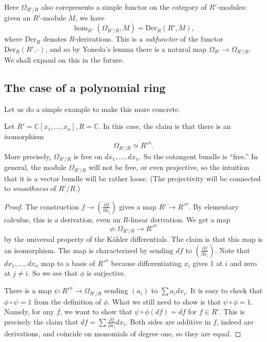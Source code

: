 Here $\Omega_{R'/R}$ also corepresents a simple functor on the category of
$R'$-modules: given an $R'$-module $M$, we have
\[ \hom_{R'}(\Omega_{R'/R}, M) = \mathrm{Der}_R(R', M),  \]
where $\mathrm{Der}_R$ denotes $R$-derivations.
This is a \emph{subfunctor} of the functor $\mathrm{Der}_R(R', \cdot)$, and so
by Yoneda's lemma there is a natural map $\Omega_{R'} \to \Omega_{R'/R}$.
We shall expand on this in the future.

\subsection{The case of a polynomial ring}
Let us do a simple example to make this more concrete.

\begin{example} \label{polynomialringdiff}
Let $R' = \mathbb{C}[x_1, \dots, x_n], R = \mathbb{C}$. In this case, the claim
is that there is an isomorphism
\[ \Omega_{R'/R} \simeq R'^n.  \]
More precisely, $\Omega_{R'/R}$ is free on $dx_1, \dots,dx_n$. So the cotangent
bundle is ``free.'' In general, the module $\Omega_{R'/R}$ will not be free, or
even projective, so the intuition that it is a vector bundle will be rather
loose. (The projectivity will be connected to \emph{smoothness} of $R'/R$.)

\begin{proof} 
The construction $f \to \left( \frac{\partial f}{\partial x_i}  \right)$ gives
a map $R' \to R'^n$. By elementary calculus, this is a derivation, even an
$R$-linear derivation.  We get a map
\[ \phi:\Omega_{R'/R} \to R'^n  \]
by the universal property of the K\"ahler differentials. The claim is that this
map is an isomorphism. The map is characterized by sending $df$ to $\left(
\frac{\partial f}{\partial x_i}\right)$. Note that $dx_1, \dots, dx_n$ map to a
basis of $R'^n$ because differentiating $x_i$ gives 1 at $i$ and zero at $j
\neq i$. So we see that $\phi$ is surjective. 

There is a map $\psi: R'^n \to \Omega_{R'/R}$ sending $\left(a_i  \right)$ to
$\sum a_i dx_i$. It is easy to check that $\phi \circ \psi = 1$ from the
definition of $\phi$. What we still need to show is that $\psi \circ \phi =1$.
Namely, for any $f$, we want to show that $\psi \circ \phi(df) = df$ for $f \in
R'$. This is precisely the claim that $df = \sum \frac{\partial f}{\partial
x_i} dx_i$. Both sides are additive in $f$, indeed are derivations, and
coincide on monomials of degree one, so they are equal.
\end{proof} 

\end{example} 

